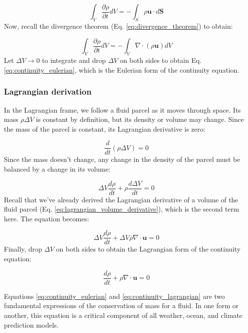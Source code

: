 \documentclass[12pt]{article}
\numberwithin{equation}{section}
\numberwithin{figure}{section}
\numberwithin{table}{section}
\begin{document}
\begin{equation}
  \int_V \frac{\partial \rho}{\partial t} dV = - \int_S \rho \mathbf{u} \cdot d\mathbf{S}
\end{equation}
Now, recall the divergence theorem (Eq. \ref{eq:divergence_theorem}) to obtain:

\begin{equation}
  \int_V \frac{\partial \rho}{\partial t} dV = - \int_V \nabla \cdot (\rho \mathbf{u}) dV
\end{equation}
Let $\Delta V \to 0$ to integrate and drop $\Delta V$ on both sides to obtain
Eq. \ref{eq:continuity_eulerian}, which is the Eulerian form of the continuity
equation.

\subsubsection{Lagrangian derivation}

In the Lagrangian frame, we follow a fluid parcel as it moves through space.
Its mass $\rho \Delta V$ is constant by definition, but its density or volume
may change.
Since the mass of the parcel is constant, its Lagrangian derivative is zero:

\begin{equation}
  \frac{d}{dt} (\rho \Delta V) = 0
\end{equation}
Since the mass doesn't change, any change in the density of the parcel must be
balanced by a change in its volume:

\begin{equation}
  \Delta V \frac{d\rho}{dt} + \rho \frac{d\Delta V}{dt} = 0
\end{equation}
Recall that we've already derived the Lagrangian derivative of a volume of the
fluid parcel (Eq. \ref{eq:lagrangian_volume_derivative}), which is the second
term here.
The equation becomes:

\begin{equation}
  \Delta V \frac{d\rho}{dt} + \Delta V \rho \nabla \cdot \mathbf{u} = 0
\end{equation}
Finally, drop $\Delta V$ on both sides to obtain the Lagrangian form of the
continuity equation:

\begin{equation}
  \frac{d\rho}{dt} + \rho \nabla \cdot \mathbf{u} = 0
  \label{eq:continuity_lagrangian}
\end{equation}

Equations \ref{eq:continuity_eulerian} and \ref{eq:continuity_lagrangian} are
two fundamental expressions of the conservation of mass for a fluid.
In one form or another, this equation is a critical component of all weather,
ocean, and climate prediction models.
\end{document}
